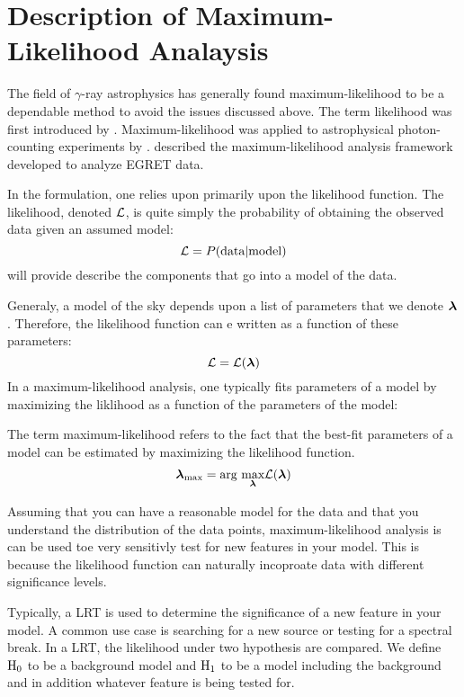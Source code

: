 \section{Description of Maximum-Likelihood Analaysis}

The field of $\gamma$-ray astrophysics has generally
found maximum-likelihood to be a dependable method to
avoid the issues discussed above.  The term likelihood was
first introduced by \cite{fisher_1925_statistical-methods}.
Maximum-likelihood was applied to astrophysical photon-counting
experiments by \cite{cash_1979_parameter-estimation}.
\cite{mattox_1996_likelihood-analysis} described the maximum-likelihood
analysis framework developed to analyze \ac{EGRET} data.

In the formulation, one relies upon primarily upon the likelihood
function.  The likelihood, denoted $\mathcal{L}$, is quite simply the
probability of obtaining the observed data given an assumed model:
\begin{equation}
  \mathcal{L} = P(\text{data}|\text{model})
\end{equation}
 will provide describe the
components that go into a model of the data.

Generaly, a model of the sky depends upon a list of parameters that we
denote $\boldsymbol{\lambda}$.  Therefore, the likelihood function can e written
as a function of these parameters:
\begin{equation}
  \mathcal{L} = \mathcal{L}(\boldsymbol{\lambda})
\end{equation}
In a maximum-likelihood analysis, one typically fits parameters of a model
by maximizing the liklihood as a function of the parameters of the model:

The term maximum-likelihood refers to the fact that the best-fit
parameters of a model can be estimated by maximizing the likelihood
function.
\begin{equation}
\boldsymbol{\lambda}_\text{max} = \underset{}{\text{arg }}\underset{\boldsymbol{\lambda}}{\text{max}} \mathcal{L}(\boldsymbol{\lambda})
\end{equation}

Assuming that you can have a reasonable model for the data and that
you understand the distribution of the data points, maximum-likelihood
analysis is can be used toe very sensitivly test for new features in
your model.  This is because the likelihood function can naturally
incoproate data with different significance levels.

Typically, a \ac{LRT} is used to determine the significance of
a new feature in your model. A common use case is searching for a new source
or testing for a spectral break. In a \ac{LRT}, the likelihood
under two hypothesis are compared. We define $\text{H}_0$ to be 
a background model and $\text{H}_1$ to be a model including
the background and in addition whatever feature is being tested for.

